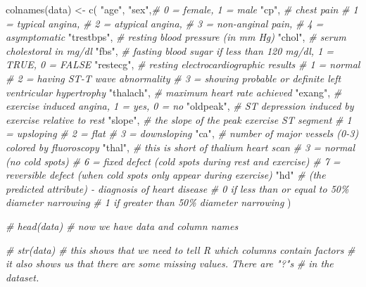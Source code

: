 \documentclass[
]{book}
\newenvironment{Shaded}{\begin{snugshade}}{\end{snugshade}}
\newcommand{\CommentTok}[1]{\textcolor[rgb]{0.56,0.35,0.01}{\textit{#1}}}
\newcommand{\FunctionTok}[1]{\textcolor[rgb]{0.00,0.00,0.00}{#1}}
\newcommand{\NormalTok}[1]{#1}
\newcommand{\OtherTok}[1]{\textcolor[rgb]{0.56,0.35,0.01}{#1}}
\newcommand{\StringTok}[1]{\textcolor[rgb]{0.31,0.60,0.02}{#1}}
\begin{document}
\begin{Shaded}
\begin{Highlighting}[]
\FunctionTok{colnames}\NormalTok{(data) }\OtherTok{\textless{}{-}} \FunctionTok{c}\NormalTok{(}
  \StringTok{"age"}\NormalTok{,}
  \StringTok{"sex"}\NormalTok{,}\CommentTok{\# 0 = female, 1 = male}
  \StringTok{"cp"}\NormalTok{, }\CommentTok{\# chest pain }
          \CommentTok{\# 1 = typical angina, }
          \CommentTok{\# 2 = atypical angina, }
          \CommentTok{\# 3 = non{-}anginal pain, }
          \CommentTok{\# 4 = asymptomatic}
  \StringTok{"trestbps"}\NormalTok{, }\CommentTok{\# resting blood pressure (in mm Hg)}
  \StringTok{"chol"}\NormalTok{, }\CommentTok{\# serum cholestoral in mg/dl}
  \StringTok{"fbs"}\NormalTok{,  }\CommentTok{\# fasting blood sugar if less than 120 mg/dl, 1 = TRUE, 0 = FALSE}
  \StringTok{"restecg"}\NormalTok{, }\CommentTok{\# resting electrocardiographic results}
          \CommentTok{\# 1 = normal}
          \CommentTok{\# 2 = having ST{-}T wave abnormality}
          \CommentTok{\# 3 = showing probable or definite left ventricular hypertrophy}
  \StringTok{"thalach"}\NormalTok{, }\CommentTok{\# maximum heart rate achieved}
  \StringTok{"exang"}\NormalTok{,   }\CommentTok{\# exercise induced angina, 1 = yes, 0 = no}
  \StringTok{"oldpeak"}\NormalTok{, }\CommentTok{\# ST depression induced by exercise relative to rest}
  \StringTok{"slope"}\NormalTok{, }\CommentTok{\# the slope of the peak exercise ST segment }
          \CommentTok{\# 1 = upsloping }
          \CommentTok{\# 2 = flat }
          \CommentTok{\# 3 = downsloping }
  \StringTok{"ca"}\NormalTok{, }\CommentTok{\# number of major vessels (0{-}3) colored by fluoroscopy}
  \StringTok{"thal"}\NormalTok{, }\CommentTok{\# this is short of thalium heart scan}
          \CommentTok{\# 3 = normal (no cold spots)}
          \CommentTok{\# 6 = fixed defect (cold spots during rest and exercise)}
          \CommentTok{\# 7 = reversible defect (when cold spots only appear during exercise)}
  \StringTok{"hd"} \CommentTok{\# (the predicted attribute) {-} diagnosis of heart disease }
          \CommentTok{\# 0 if less than or equal to 50\% diameter narrowing}
          \CommentTok{\# 1 if greater than 50\% diameter narrowing}
\NormalTok{  )}

\CommentTok{\# head(data) \# now we have data and column names}

\CommentTok{\# str(data) \# this shows that we need to tell R which columns contain factors}
          \CommentTok{\# it also shows us that there are some missing values. There are "?"s}
          \CommentTok{\# in the dataset.}


\end{Highlighting}
\end{Shaded}
\end{document}
